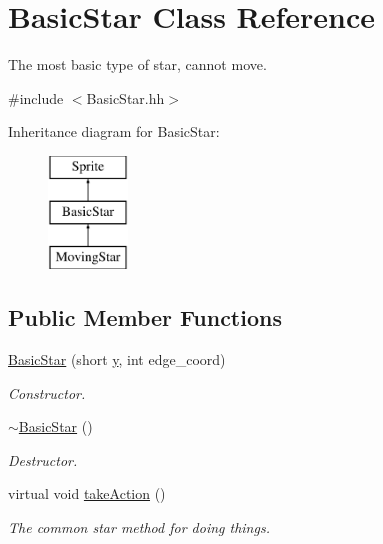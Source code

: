 \hypertarget{classBasicStar}{\section{Basic\-Star Class Reference}
\label{classBasicStar}
}


The most basic type of star, cannot move.  




{\ttfamily \#include $<$Basic\-Star.\-hh$>$}

Inheritance diagram for Basic\-Star\-:\begin{figure}[H]
\begin{center}
\leavevmode
\includegraphics[height=3.000000cm]{classBasicStar}
\end{center}
\end{figure}
\subsection*{Public Member Functions}
\begin{DoxyCompactItemize}
\item 
\hyperlink{classBasicStar_a7cda590583a4a67c057487c7fc61281b}{Basic\-Star} (short \hyperlink{classSprite_afca2c03aad9d2526427470688ae76439}{y}, int edge\-\_\-coord)
\begin{DoxyCompactList}\small\item\em Constructor. \end{DoxyCompactList}\item 
\hyperlink{classBasicStar_a6ac994000481a4e155a16c4f96f9e17b}{$\sim$\-Basic\-Star} ()
\begin{DoxyCompactList}\small\item\em Destructor. \end{DoxyCompactList}\item 
virtual void \hyperlink{classBasicStar_aadca2b88ce5766a1a6cd95accbb72bfb}{take\-Action} ()
\begin{DoxyCompactList}\small\item\em The common star method for doing things. \end{DoxyCompactList}\end{DoxyCompactItemize}
